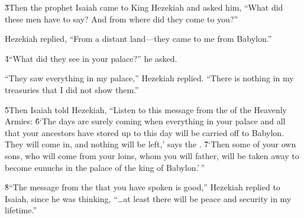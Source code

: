 \v{3}Then the prophet Isaiah came to King Hezekiah and asked him, ``What did these men have to say? And from where did they come to you?''

Hezekiah replied, ``From a distant land---they came to me from Babylon.''

\v{4}``What did they see in your palace?'' he asked.

``They saw everything in my palace,'' Hezekiah replied. ``There is nothing in my treasuries that I did not show them.''

\v{5}Then Isaiah told Hezekiah, ``Listen to this message from the  of the Heavenly Armies: \v{6}`The days are surely coming when everything in your palace and all that your ancestors have stored up to this day will be carried off to Babylon. They will come in, and nothing will be left,' says the . \v{7}`Then some of your own sons, who will come from your loins, whom you will father, will be taken away to become eunuchs in the palace of the king of Babylon.'\,''

\v{8}``The message from the  that you have spoken is good,'' Hezekiah replied to Isaiah, since he was thinking, ``{\ldots}at least there will be peace and security in my lifetime.''

